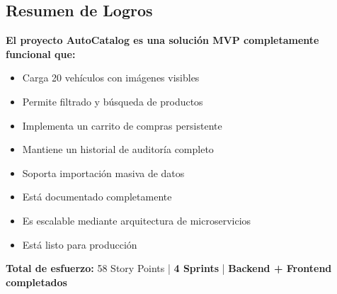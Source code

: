 \documentclass[12pt,a4paper]{article}
\begin{document}
\subsection{Resumen de Logros}

\textbf{El proyecto AutoCatalog es una solución MVP completamente funcional que:}

\begin{itemize}
    \item Carga 20 vehículos con imágenes visibles
    \item Permite filtrado y búsqueda de productos
    \item Implementa un carrito de compras persistente
    \item Mantiene un historial de auditoría completo
    \item Soporta importación masiva de datos
    \item Está documentado completamente
    \item Es escalable mediante arquitectura de microservicios
    \item Está listo para producción
\end{itemize}

\textbf{Total de esfuerzo:} 58 Story Points | \textbf{4 Sprints} | \textbf{Backend + Frontend completados}
\end{document}
